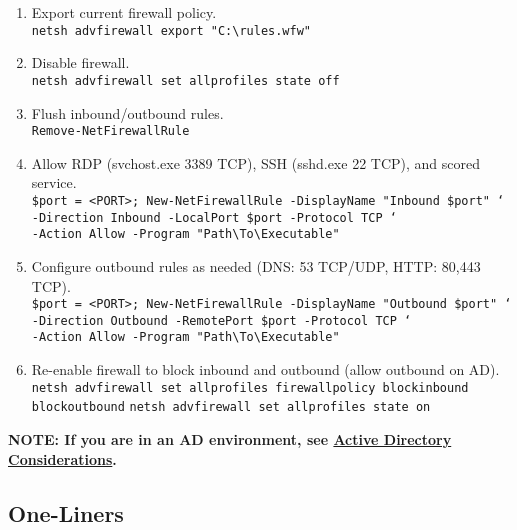 \documentclass[12pt,letterpaper]{article}
\def\code#1{\textcolor{iris}{\texttt{#1}}}
\def\bf#1{\textbf{#1}}
\begin{document}
\begin{enumerate}
\begin{enumerate}
			\item Export current firewall policy. \\
				\code{netsh advfirewall export "C:\textbackslash{}rules.wfw"}
			\item Disable firewall. \\
				\code{netsh advfirewall set allprofiles state off}
			\item Flush inbound/outbound rules. \\
				\code{Remove-NetFirewallRule}
			\item Allow RDP (svchost.exe 3389 TCP), SSH (sshd.exe 22 TCP), and scored service. \\
				\code{\$port = <PORT>; New-NetFirewallRule -DisplayName "Inbound \$port" ` \\
				-Direction Inbound -LocalPort \$port -Protocol TCP ` \\
				-Action Allow -Program "Path\textbackslash{}To\textbackslash{}Executable"}
			\item Configure outbound rules as needed (DNS: 53 TCP/UDP, HTTP: 80,443 TCP). \\
				\code{\$port = <PORT>; New-NetFirewallRule -DisplayName "Outbound \$port" ` \\
				-Direction Outbound -RemotePort \$port -Protocol TCP ` \\
				-Action Allow -Program "Path\textbackslash{}To\textbackslash{}Executable"}
			\item Re-enable firewall to block inbound and outbound (allow outbound on AD). \\
				\code{netsh advfirewall set allprofiles firewallpolicy blockinbound blockoutbound}
				\code{netsh advfirewall set allprofiles state on}
		\end{enumerate}
	\bf{NOTE: If you are in an AD environment, see \hyperref[subsec:adcon]{Active Directory Considerations}.}
\end{enumerate}

\pagebreak

\subsection{One-Liners}
\label{subsec:woliner}
\end{document}

